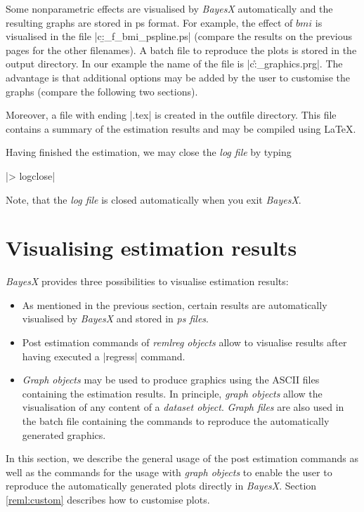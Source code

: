 Some nonparametric effects are visualised by {\it BayesX} automatically and the resulting graphs are stored in ps format. For
example, the effect of $\mathit{bmi}$ is visualised in the file |c:\data\b_f_bmi_pspline.ps| (compare the results on the
previous pages for the other filenames). A batch file to reproduce the plots is stored in the output directory. In our example
the name of the file is |c:\data\r_graphics.prg|. The advantage is that additional options may be added by the user to
customise the graphs (compare the following two sections).

Moreover, a file with ending |.tex| is created in the outfile directory. This file contains a summary of the estimation results
and may be compiled using \LaTeX.

Having finished the estimation, we may close the {\it log file} by typing

|> logclose|

Note, that the {\it log file} is closed automatically when you exit {\it BayesX}.

\section{Visualising estimation results}\label{reml:visual}

{\it BayesX} provides three possibilities to visualise estimation results:
\begin{itemize}
\item As mentioned in the previous section, certain results are automatically visualised by {\it BayesX} and stored in {\it
    ps files}.
\item Post estimation commands of {\it remlreg objects} allow to visualise results after having executed a |regress|
    command.
\item {\it Graph objects} may be used to produce graphics using the ASCII files containing the estimation results. In
    principle, {\it graph objects} allow the visualisation of any content of a {\it dataset object}. {\it Graph files} are
    also used in the batch file containing the commands to reproduce the automatically generated graphics.
\end{itemize}

In this section, we describe the general usage of the post estimation commands as well as the commands for the usage with {\it
graph objects} to enable the user to reproduce the automatically generated plots directly in {\it BayesX}. Section
\ref{reml:custom} describes how to customise plots.


